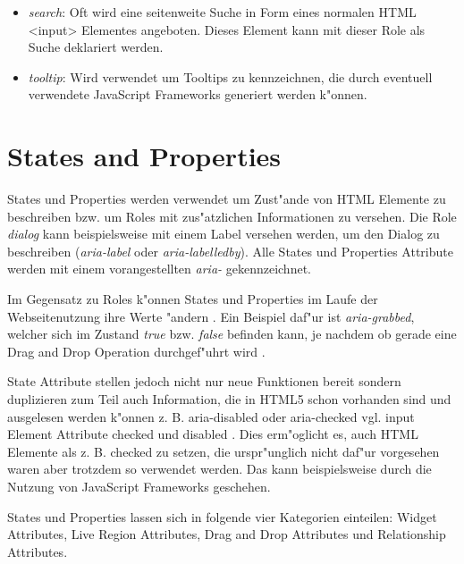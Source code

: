 \documentclass[a4paper,bibtotoc,oneside]{scrbook}
\begin{document}
\begin{itemize}
\item \emph{search}: Oft wird eine seitenweite Suche in Form eines normalen HTML <input> Elementes angeboten. Dieses Element kann mit dieser Role als Suche deklariert werden. \cite[Abschnitt 5.4, search]{aria_roles}

\item \emph{tooltip}: Wird verwendet um Tooltips zu kennzeichnen, die durch eventuell verwendete JavaScript Frameworks generiert werden k"onnen. \cite[Abschnitt 5.4, tooltip]{aria_roles}
\end{itemize}



\section{States and Properties}
States und Properties werden verwendet um Zust"ande von HTML Elemente zu beschreiben bzw. um Roles mit zus"atzlichen Informationen zu versehen. Die Role \emph{dialog} kann beispielsweise mit einem Label versehen werden, um den Dialog zu beschreiben (\emph{aria-label} oder \emph{aria-labelledby})\cite[Abschnitt 5.4, dialog]{aria_roles}. Alle States und Properties Attribute werden mit einem vorangestellten \emph{aria-} gekennzeichnet. \cite[Abschnitt 6.1]{aria_states}

Im Gegensatz zu Roles k"onnen States und Properties im Laufe der Webseitenutzung ihre Werte "andern \cite[S. 29]{mod_software}. Ein Beispiel daf"ur ist \emph{aria-grabbed}, welcher sich im Zustand \emph{true} bzw. \emph{false} befinden kann, je nachdem ob gerade eine Drag and Drop Operation durchgef"uhrt wird \cite[Abschnitt 6.6, aria-grabbed]{aria_states}.

State Attribute stellen jedoch nicht nur neue Funktionen bereit sondern duplizieren zum Teil auch Information, die in HTML5 schon vorhanden sind und ausgelesen werden k"onnen z. B. aria-disabled oder aria-checked \cite[States and Properties]{aria} vgl. input Element Attribute checked und disabled \cite[Abschnitt Forms, Input Element]{html4}. Dies erm"oglicht es, auch HTML Elemente als z. B. checked zu setzen, die urspr"unglich nicht daf"ur vorgesehen waren aber trotzdem so verwendet werden. Das kann beispielsweise durch die Nutzung von JavaScript Frameworks geschehen. 

States und Properties lassen sich in folgende vier Kategorien einteilen: Widget Attributes, Live Region Attributes, Drag and Drop Attributes und Relationship Attributes. \cite[Abschnitt 6.5]{aria_states}
\end{document}
